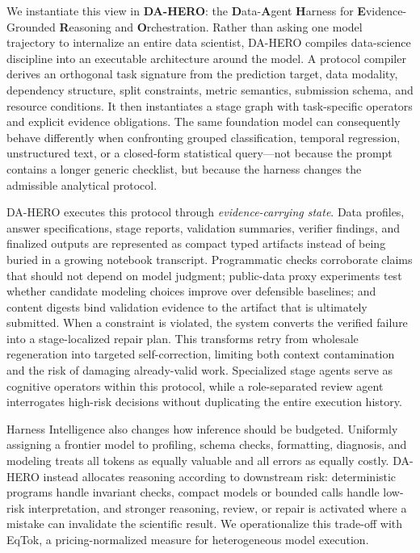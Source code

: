 \documentclass[letterpaper]{article} %
\begin{document}
We instantiate this view in \textbf{DA-HERO}: the \textbf{D}ata-\textbf{A}gent \textbf{H}arness for \textbf{E}vidence-Grounded \textbf{R}easoning and \textbf{O}rchestration. Rather than asking one model trajectory to internalize an entire data scientist, DA-HERO compiles data-science discipline into an executable architecture around the model. A protocol compiler derives an orthogonal task signature from the prediction target, data modality, dependency structure, split constraints, metric semantics, submission schema, and resource conditions. It then instantiates a stage graph with task-specific operators and explicit evidence obligations. The same foundation model can consequently behave differently when confronting grouped classification, temporal regression, unstructured text, or a closed-form statistical query---not because the prompt contains a longer generic checklist, but because the harness changes the admissible analytical protocol.

DA-HERO executes this protocol through \emph{evidence-carrying state}. Data profiles, answer specifications, stage reports, validation summaries, verifier findings, and finalized outputs are represented as compact typed artifacts instead of being buried in a growing notebook transcript. Programmatic checks corroborate claims that should not depend on model judgment; public-data proxy experiments test whether candidate modeling choices improve over defensible baselines; and content digests bind validation evidence to the artifact that is ultimately submitted. When a constraint is violated, the system converts the verified failure into a stage-localized repair plan. This transforms retry from wholesale regeneration into targeted self-correction, limiting both context contamination and the risk of damaging already-valid work. Specialized stage agents serve as cognitive operators within this protocol, while a role-separated review agent interrogates high-risk decisions without duplicating the entire execution history.

Harness Intelligence also changes how inference should be budgeted. Uniformly assigning a frontier model to profiling, schema checks, formatting, diagnosis, and modeling treats all tokens as equally valuable and all errors as equally costly. DA-HERO instead allocates reasoning according to downstream risk: deterministic programs handle invariant checks, compact models or bounded calls handle low-risk interpretation, and stronger reasoning, review, or repair is activated where a mistake can invalidate the scientific result. We operationalize this trade-off with EqTok, a pricing-normalized measure for heterogeneous model execution.
\end{document}
